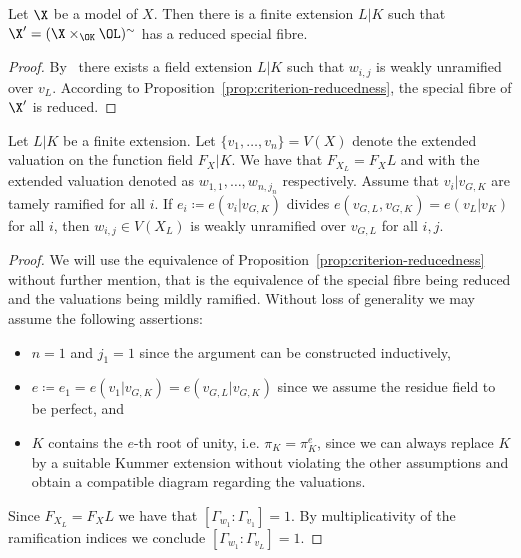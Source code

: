 \begin{theorem}
    Let $\X$ be a model of $X$.
    Then there is a finite extension $L|K$ such that $\X' = (\X \times_{\OK}\OL)^\sim$ has a reduced special fibre.
\end{theorem}

\begin{proof}
    By~\cite[Theorem 1.0]{Epp} there exists a field extension $L|K$ such that $w_{i,j}$ is weakly unramified over $v_L$.
    According to Proposition~\ref{prop:criterion-reducedness}, the special fibre of $\X'$ is reduced.
\end{proof}

\begin{lemma}[Abhyanka]\label{lem:abhyanka}
    Let $L|K$ be a finite extension.
    Let $\lbrace v_1, \dots, v_n \rbrace = V(X)$ denote the extended valuation on the function field $F_X|K$.
    We have that $F_{X_L} = F_X L$ and with the extended valuation denoted as $w_{1,1}, \dots, w_{n, j_n}$ respectively.
    Assume that $v_i|v_{{\scriptscriptstyle G}, K}$ are tamely ramified for all $i$.
    If $e_i \coloneqq e(v_i|v_{{\scriptscriptstyle G},K})$ divides
    $e(v_{{\scriptscriptstyle G}, L}, v_{{\scriptscriptstyle G}, K}) = e(v_L|v_K)$ for all $i$, then $w_{i,j} \in V(X_L)$
    is weakly unramified over $v_{{\scriptscriptstyle G}, L}$ for all $i,j$.
\end{lemma}

\begin{proof}
    We will use the equivalence of Proposition~\ref{prop:criterion-reducedness} without further mention,
    that is the equivalence of the special fibre being reduced and the valuations being mildly ramified.
    Without loss of generality we may assume the following assertions:
    \begin{itemize}
        \item $n = 1$ and $j_1 = 1$ since the argument can be constructed inductively,
        \item $e \coloneqq e_1 = e(v_1|v_{{\scriptscriptstyle G},K}) = e(v_{{\scriptscriptstyle G},L}|v_{{\scriptscriptstyle G},K})$
            since we assume the residue field to be perfect, and
        \item $K$ contains the $e$-th root of unity, i.e. $\pi_K = \pi_K^e$, since we can always replace $K$ by a suitable
            Kummer extension without violating the other assumptions and obtain a compatible diagram regarding the valuations.
    \end{itemize}
    Since $F_{X_L} = F_X L$ we have that $[\Gamma_{w_1}: \Gamma_{v_1}] = 1$.
    By multiplicativity of the ramification indices we conclude $[\Gamma_{w_1}: \Gamma_{v_L}] = 1$.
\end{proof}

